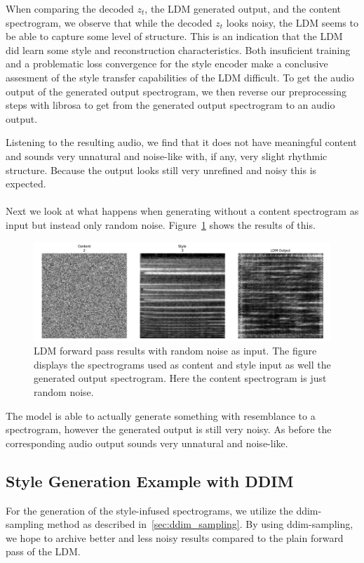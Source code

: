 \noindent When comparing the decoded \(z_t\), the LDM generated output, and the content spectrogram, we observe that while the decoded \(z_t\) looks noisy, the LDM seems to be able to capture some level of structure. This is an indication that the LDM did learn some style and reconstruction characteristics. Both insuficient training and a problematic loss convergence for the style encoder make a conclusive assesment of the style transfer capabilities of the LDM difficult. To get the audio output of the generated output spectrogram, we then reverse our preprocessing steps with librosa to get from the generated output spectrogram to an audio output.

Listening to the resulting audio, we find that it does not have meaningful content and sounds very unnatural and noise-like with, if any, very slight rhythmic structure. Because the output looks still very unrefined and noisy this is expected.
\\\\
Next we look at what happens when generating without a content spectrogram as input but instead only random noise.
Figure~\ref{fig:ldm_forward_pass_random} shows the results of this.
\begin{figure}[h]
    \centering
    \includegraphics[width=\textwidth]{figures/test_ldm_forward_function_no_content_output_200ep.png}
    \caption{LDM forward pass results with random noise as input.
    The figure displays the spectrograms used as content and style input as well the generated output spectrogram. Here the content spectrogram is just random noise.}
    \label{fig:ldm_forward_pass_random}
\end{figure}
The model is able to actually generate something with resemblance to a spectrogram, however the generated output is still very noisy.
As before the corresponding audio output sounds very unnatural and noise-like.

\subsection{Style Generation Example with DDIM}
For the generation of the style-infused spectrograms, we utilize the ddim-sampling method as described in~\ref{sec:ddim_sampling}.
By using ddim-sampling, we hope to archive better and less noisy results compared to the plain forward pass of the LDM.

